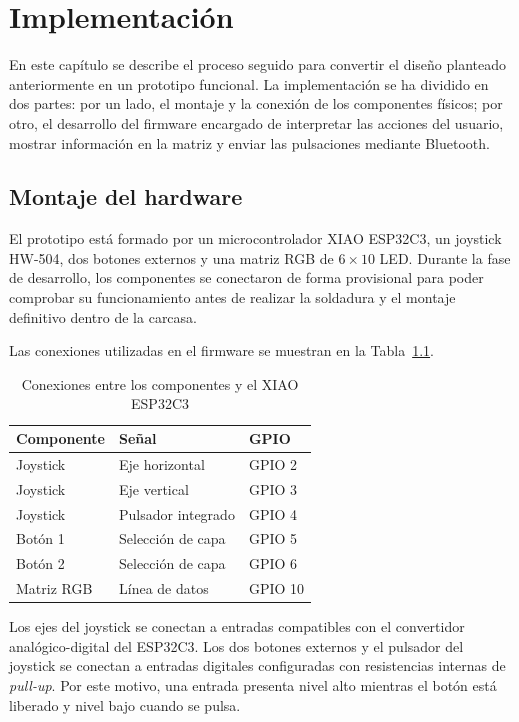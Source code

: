 \chapter{Implementación}
\label{ch:implementacion}

En este capítulo se describe el proceso seguido para convertir el diseño planteado anteriormente en un prototipo funcional. La implementación se ha dividido en dos partes: por un lado, el montaje y la conexión de los componentes físicos; por otro, el desarrollo del firmware encargado de interpretar las acciones del usuario, mostrar información en la matriz y enviar las pulsaciones mediante Bluetooth.

\section{Montaje del hardware}
\label{sec:montaje-hardware}

El prototipo está formado por un microcontrolador XIAO ESP32C3, un joystick HW-504, dos botones externos y una matriz RGB de \(6 \times 10\) LED. Durante la fase de desarrollo, los componentes se conectaron de forma provisional para poder comprobar su funcionamiento antes de realizar la soldadura y el montaje definitivo dentro de la carcasa.

Las conexiones utilizadas en el firmware se muestran en la Tabla~\ref{tab:conexiones-hardware}.

\begin{table}[ht]
    \centering
    \caption{Conexiones entre los componentes y el XIAO ESP32C3}
    \label{tab:conexiones-hardware}
    \begin{tabularx}{\textwidth}{@{}lXl@{}}
        \toprule
        \textbf{Componente} & \textbf{Señal} & \textbf{GPIO} \\
        \midrule
        Joystick & Eje horizontal & GPIO 2 \\
        Joystick & Eje vertical & GPIO 3 \\
        Joystick & Pulsador integrado & GPIO 4 \\
        Botón 1 & Selección de capa & GPIO 5 \\
        Botón 2 & Selección de capa & GPIO 6 \\
        Matriz RGB & Línea de datos & GPIO 10 \\
        \bottomrule
    \end{tabularx}
\end{table}

Los ejes del joystick se conectan a entradas compatibles con el convertidor analógico-digital del ESP32C3. Los dos botones externos y el pulsador del joystick se conectan a entradas digitales configuradas con resistencias internas de \textit{pull-up}. Por este motivo, una entrada presenta nivel alto mientras el botón está liberado y nivel bajo cuando se pulsa.

